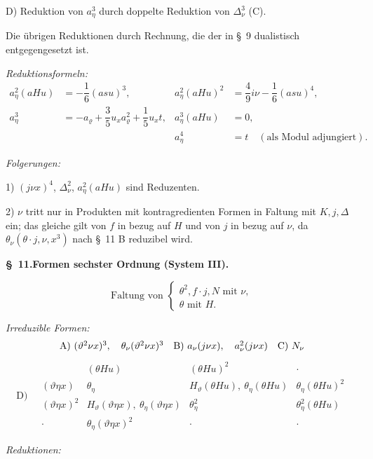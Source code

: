\documentclass[11pt]{article}
\newcommand{\A}{\Delta}
\newcommand{\R}{\varrho}
\begin{document}
\noindent D) Reduktion von $a_\eta^3$ durch doppelte Reduktion von $\A_\nu^3$ (C).

Die übrigen Reduktionen durch Rechnung, die der in \S\ 9 dualistisch entgegengesetzt ist.

\noindent\emph{Reduktionsformeln:}
\[
\tag{11}
\begin{array}{rl|rl}
a_\eta^2(aHu)&=-\dfrac16(asu)^3,&
 a_\eta^2(aHu)^2&=\dfrac49 i\nu-\dfrac16(asu)^4,\\[0.7em]
a_\eta^3&=-a_\R+\dfrac35u_xa_\R^2+\dfrac15u_xt,
& a_\eta^3(aHu)&=0,\\[0.7em]
&&a_\eta^4&=t\quad(\text{als Modul adjungiert}).
\end{array}
\]

\noindent\emph{Folgerungen:}

1) $(j\nu x)^4$, $\A_\nu^2$, $a_\eta^2(aHu)$ sind Reduzenten.

2) $\nu$ tritt nur in Produkten mit kontragredienten Formen in Faltung mit $K,j,\A$ ein; das gleiche gilt von $f$ in bezug auf $H$ und von $j$ in bezug auf $\nu$, da $\theta_\nu(\theta\cdot j,\nu,x^3)$ nach \S\ 11 B reduzibel wird.

\begin{center}
\textbf{\S\ 11.\quad Formen sechster Ordnung (System III).}
\end{center}
\[
\text{Faltung von }\left\{\begin{array}{l}
\theta^2,
 f\cdot j,
 N \text{ mit }\nu,\\
\theta\text{ mit }H.
\end{array}\right.
\]

\noindent\emph{Irreduzible Formen:}
\[
\begin{array}{c@{\quad}c@{\quad}c}
\text{A)}\ (\vartheta^2\nu x)^3,\quad \theta_\nu(\vartheta^2\nu x)^3
&
\text{B)}\ a_\nu(j\nu x),\quad a_\nu^2(j\nu x)
&
\text{C)}\ N_\nu
\end{array}
\]
\[
\text{D)}\quad
\begin{array}{c|c|c|c}
 & (\theta Hu)&(\theta Hu)^2&\cdot\\
(\vartheta\eta x)&\theta_\eta&H_\vartheta(\theta Hu),\ \theta_\eta(\theta Hu)&\theta_\eta(\theta Hu)^2\\
(\vartheta\eta x)^2&H_\vartheta(\vartheta\eta x),\ \theta_\eta(\vartheta\eta x)&\theta_\eta^2&\theta_\eta^2(\theta Hu)\\
\cdot&\theta_\eta(\vartheta\eta x)^2&\cdot&\cdot
\end{array}
\]

\noindent\emph{Reduktionen:}
\end{document}

